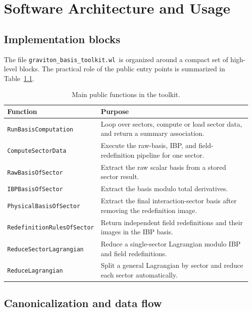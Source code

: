 \documentclass[11pt]{report}
\numberwithin{equation}{chapter}
\newcommand{\toolkit}{\texttt{graviton\_basis\_toolkit.wl}}
\begin{document}
\chapter{Software Architecture and Usage}

\section{Implementation blocks}

The file \toolkit\ is organized around a compact set of high-level blocks.
The practical role of the public entry points is summarized in Table~\ref{tab:functions}.

\begin{table}[tbp]
\centering
\caption{Main public functions in the toolkit.}
\label{tab:functions}
{\small
\begin{tabular}{>{\raggedright\arraybackslash}p{} >{\raggedright\arraybackslash}p{}}
\toprule
Function & Purpose \\
\midrule
\texttt{RunBasisComputation} & Loop over sectors, compute or load sector data, and return a summary association. \\
\texttt{ComputeSectorData} & Execute the raw-basis, IBP, and field-redefinition pipeline for one sector. \\
\texttt{RawBasisOfSector} & Extract the raw scalar basis from a stored sector result. \\
\texttt{IBPBasisOfSector} & Extract the basis modulo total derivatives. \\
\texttt{PhysicalBasisOfSector} & Extract the final interaction-sector basis after removing the redefinition image. \\
\texttt{RedefinitionRulesOfSector} & Return independent field redefinitions and their images in the IBP basis. \\
\texttt{ReduceSectorLagrangian} & Reduce a single-sector Lagrangian modulo IBP and field redefinitions. \\
\texttt{ReduceLagrangian} & Split a general Lagrangian by sector and reduce each sector automatically. \\
\bottomrule
\end{tabular}
}
\end{table}

\section{Canonicalization and data flow}
\end{document}
